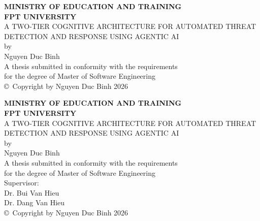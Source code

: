 \documentclass[12pt,a4paper]{report}
\begin{document}

\pagestyle{empty}

\begin{titlepage}
    \centering
    \vspace*{1cm}
    {\large\textbf{MINISTRY OF EDUCATION AND TRAINING}}\\[0.1cm]
    {\large\textbf{FPT UNIVERSITY}}\\[3cm]

    {\Large A TWO-TIER COGNITIVE ARCHITECTURE FOR AUTOMATED THREAT DETECTION AND RESPONSE USING AGENTIC AI}\\[3cm]

    by\\[1cm]

    Nguyen Duc Binh\\[3cm]

    A thesis submitted in conformity with the requirements\\
    for the degree of Master of Software Engineering\\[1cm]

    \vfill
    {\normalsize \copyright\ Copyright by Nguyen Duc Binh 2026}
\end{titlepage}

\begin{titlepage}
    \centering
    \vspace*{1cm}
    {\large\textbf{MINISTRY OF EDUCATION AND TRAINING}}\\[0.1cm]
    {\large\textbf{FPT UNIVERSITY}}\\[3cm]

    {\Large A TWO-TIER COGNITIVE ARCHITECTURE FOR AUTOMATED THREAT DETECTION AND RESPONSE USING AGENTIC AI}\\[3cm]

    by\\[1cm]

    Nguyen Duc Binh\\[3cm]

    A thesis submitted in conformity with the requirements\\
    for the degree of Master of Software Engineering\\[2cm]

    Supervisor:\\
    Dr. Bui Van Hieu\\
    Dr. Dang Van Hieu\\[1cm]

    \vfill
    {\normalsize \copyright\ Copyright by Nguyen Duc Binh 2026}
\end{titlepage}
\end{document}

